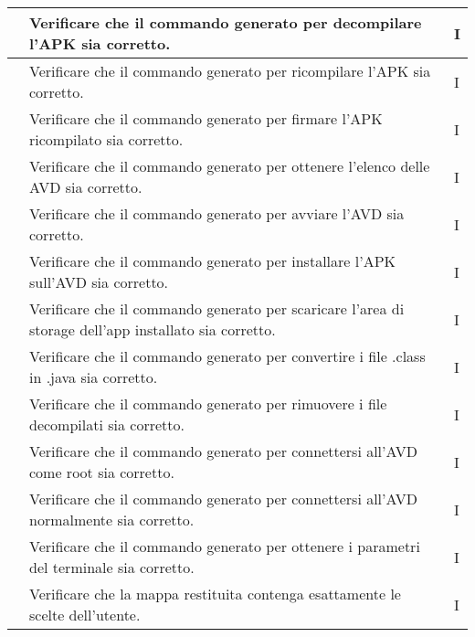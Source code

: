 \begin{center}
\begin{longtable}{ |C{3cm} | C{8.5cm}| C{1.5cm} |}
                     & Verificare che il commando generato per decompilare l'APK sia corretto.                                 & I              \\\hline
                     & Verificare che il commando generato per ricompilare l'APK sia corretto.                                 & I              \\\hline
                     & Verificare che il commando generato per firmare l'APK ricompilato sia corretto.                         & I              \\\hline
                     & Verificare che il commando generato per ottenere l'elenco delle AVD sia corretto.                       & I              \\\hline
                     & Verificare che il commando generato per avviare l'AVD sia corretto.                                     & I              \\\hline
                     & Verificare che il commando generato per installare l'APK sull'AVD sia corretto.                         & I              \\\hline
                     & Verificare che il commando generato per scaricare l'area di storage dell'app installato sia corretto.   & I              \\\hline
                     & Verificare che il commando generato per convertire i file .class in .java sia corretto.                 & I              \\\hline
                     & Verificare che il commando generato per rimuovere i file decompilati sia corretto.                      & I              \\\hline
                     & Verificare che il commando generato per connettersi all'AVD come root sia corretto.                     & I              \\\hline
                     & Verificare che il commando generato per connettersi all'AVD normalmente sia corretto.                   & I              \\\hline
                     & Verificare che il commando generato per ottenere i parametri del terminale sia corretto.                & I              \\\hline
                     & Verificare che la mappa restituita contenga esattamente le scelte dell'utente.                          & I              \\\hline

\end{longtable}
\end{center}
